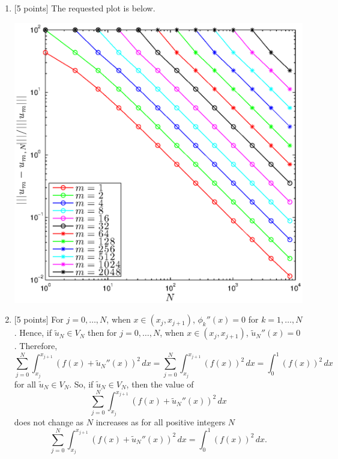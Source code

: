 \begin{solution}
\begin{enumerate}
\vspace*{1em}
\item {[5 points]} The requested plot is below.
\begin{center}
   \includegraphics[scale=0.75]{hw33c.eps}
\end{center}

\vspace*{1em}
\item {[5 points]} For $j=0,\ldots,N$, when $x\in(x_j,x_{j+1})$, $\phi_k''(x)=0$ for $k=1,\ldots,N$. Hence, if $\tilde{u}_N\in V_N$ then for $j=0,\ldots,N$, when $x\in(x_j,x_{j+1})$, $\tilde{u}_N''(x)=0$. Therefore,
\[
\sum_{j=0}^N\int_{x_j}^{x_{j+1}}(f(x)+\tilde{u}_N''(x))^2\,dx=\sum_{j=0}^N\int_{x_j}^{x_{j+1}}(f(x))^2\,dx=\int_0^1(f(x))^2\,dx
\]
for all $\tilde{u}_N\in V_N$. So, if $\tilde{u}_N\in V_N$, then the value of
\[
\sum_{j=0}^N\int_{x_j}^{x_{j+1}}(f(x)+\tilde{u}_N''(x))^2\,dx
\]
does not change as $N$ increases as for all positive integers $N$
\[
\sum_{j=0}^N\int_{x_j}^{x_{j+1}}(f(x)+\tilde{u}_N''(x))^2\,dx=\int_0^1(f(x))^2\,dx.
\]



\end{enumerate}
\end{solution}